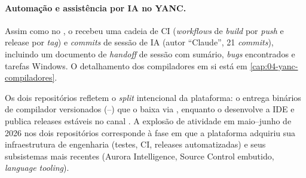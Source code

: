 \paragraph{Automação e assistência por IA no YANC.} Assim como no ,
o  recebeu uma cadeia de CI (\emph{workflows} de \emph{build} por
\emph{push} e release por \emph{tag}) e \emph{commits} de sessão de IA
(autor \enquote{Claude}, 21 \emph{commits}), incluindo um documento de
\emph{handoff} de sessão com sumário, \emph{bugs} encontrados e tarefas Windows.
O detalhamento dos compiladores em si está em
\autoref{cap:04-yanc-compiladores}.

\begin{nota}
Os dois repositórios refletem o \emph{split} intencional da plataforma: o
 entrega binários de compilador versionados (--)
que o  baixa via , enquanto o 
desenvolve a IDE e publica releases estáveis no canal . A explosão
de atividade em maio--junho de 2026 nos dois repositórios corresponde à fase em
que a plataforma adquiriu sua infraestrutura de engenharia (testes, CI, releases
automatizadas) e seus subsistemas mais recentes (Aurora Intelligence, Source
Control embutido, \emph{language tooling}).
\end{nota}
